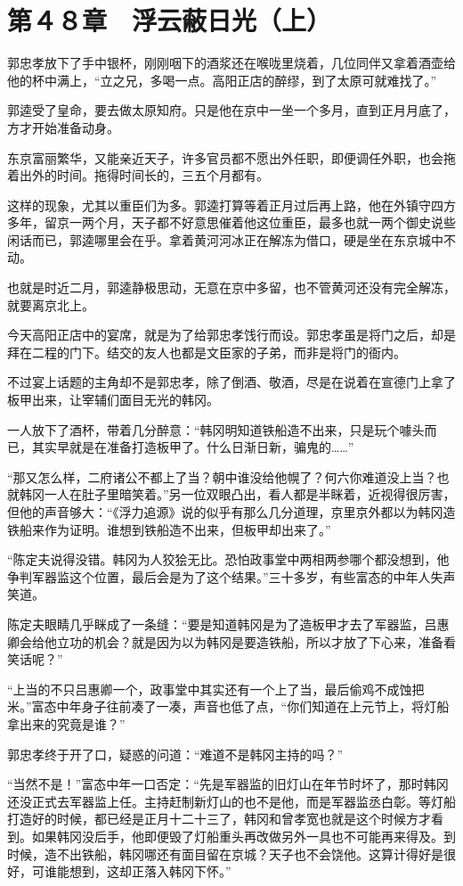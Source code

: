 \section{第４８章　浮云蔽日光（上）}

郭忠孝放下了手中银杯，刚刚咽下的酒浆还在喉咙里烧着，几位同伴又拿着酒壶给他的杯中满上，“立之兄，多喝一点。高阳正店的醉缪，到了太原可就难找了。”

郭逵受了皇命，要去做太原知府。只是他在京中一坐一个多月，直到正月月底了，方才开始准备动身。

东京富丽繁华，又能亲近天子，许多官员都不愿出外任职，即便调任外职，也会拖着出外的时间。拖得时间长的，三五个月都有。

这样的现象，尤其以重臣们为多。郭逵打算等着正月过后再上路，他在外镇守四方多年，留京一两个月，天子都不好意思催着他这位重臣，最多也就一两个御史说些闲话而已，郭逵哪里会在乎。拿着黄河河冰正在解冻为借口，硬是坐在东京城中不动。

也就是时近二月，郭逵静极思动，无意在京中多留，也不管黄河还没有完全解冻，就要离京北上。

今天高阳正店中的宴席，就是为了给郭忠孝饯行而设。郭忠孝虽是将门之后，却是拜在二程的门下。结交的友人也都是文臣家的子弟，而非是将门的衙内。

不过宴上话题的主角却不是郭忠孝，除了倒酒、敬酒，尽是在说着在宣德门上拿了板甲出来，让宰辅们面目无光的韩冈。

一人放下了酒杯，带着几分醉意：“韩冈明知道铁船造不出来，只是玩个噱头而已，其实早就是在准备打造板甲了。什么日渐日新，骗鬼的……”

“那又怎么样，二府诸公不都上了当？朝中谁没给他幌了？何六你难道没上当？也就韩冈一人在肚子里暗笑着。”另一位双眼凸出，看人都是半眯着，近视得很厉害，但他的声音够大：“《浮力追源》说的似乎有那么几分道理，京里京外都以为韩冈造铁船来作为证明。谁想到铁船造不出来，但板甲却出来了。”

“陈定夫说得没错。韩冈为人狡狯无比。恐怕政事堂中两相两参哪个都没想到，他争判军器监这个位置，最后会是为了这个结果。”三十多岁，有些富态的中年人失声笑道。

陈定夫眼睛几乎眯成了一条缝：“要是知道韩冈是为了造板甲才去了军器监，吕惠卿会给他立功的机会？就是因为以为韩冈是要造铁船，所以才放了下心来，准备看笑话呢？”

“上当的不只吕惠卿一个，政事堂中其实还有一个上了当，最后偷鸡不成蚀把米。”富态中年身子往前凑了一凑，声音也低了点，“你们知道在上元节上，将灯船拿出来的究竟是谁？”

郭忠孝终于开了口，疑惑的问道：“难道不是韩冈主持的吗？”

“当然不是！”富态中年一口否定：“先是军器监的旧灯山在年节时坏了，那时韩冈还没正式去军器监上任。主持赶制新灯山的也不是他，而是军器监丞白彰。等灯船打造好的时候，都已经是正月十二十三了，韩冈和曾孝宽也就是这个时候方才看到。如果韩冈没后手，他即便毁了灯船重头再改做另外一具也不可能再来得及。到时候，造不出铁船，韩冈哪还有面目留在京城？天子也不会饶他。这算计得好是很好，可谁能想到，这却正落入韩冈下怀。”

